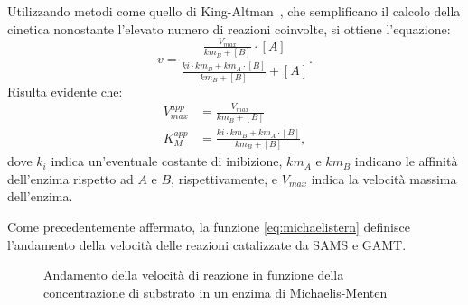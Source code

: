 Utilizzando metodi come quello di King-Altman~\cite{king1956schematic}, che semplificano il calcolo della cinetica nonostante l'elevato numero di reazioni coinvolte, si ottiene l'equazione:
\begin{equation}\label{eq:michaelistern}
v =  \frac{\frac{V_{max}}{km_B + [B]} \cdot [A]}{\frac{ki \cdot km_B + km_A \cdot [B]}{km_B + [B]} + [A]}.
\end{equation}
Risulta evidente che:
\begin{align*}
	V^{app}_{max} &= \frac{V_{max}}{km_B + [B]}\\
	K^{app}_M &= \frac{ki \cdot km_B + km_A \cdot [B]}{km_B + [B]},
\end{align*}
dove $k_i$ indica un'eventuale costante di inibizione, $km_A$ e $km_B$ indicano le affinit\`a dell'enzima rispetto ad $A$ e $B$, rispettivamente, e $V_{max}$ indica la velocit\`a massima dell'enzima.

Come precedentemente affermato, la funzione \ref{eq:michaelistern} definisce l'andamento della velocit\`a delle reazioni catalizzate da SAMS e GAMT.

\begin{figure}
	\center
	\caption{Andamento della velocit\`a di reazione in funzione della concentrazione di substrato in un enzima di Michaelis-Menten}
	\label{fig:michaelis}
\end{figure}

